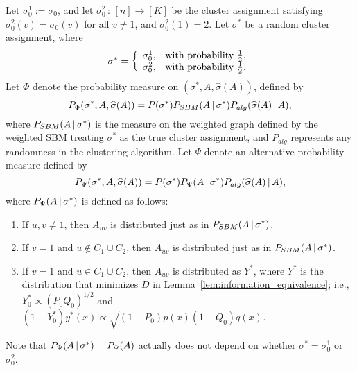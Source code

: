 \documentclass{article}
\begin{document}
Let $\sigma_0^1 := \sigma_0$, and let $\sigma_0^2 \,:\, [n] \rightarrow [K]$ be the cluster assignment satisfying $\sigma_0^2(v) = \sigma_0(v)$ for all $v \neq 1$, and $\sigma_0^2(1) = 2$. Let $\sigma^*$ be a random cluster assignment, where 
\[
\sigma^* = \left \{
     \begin{array}{cc}
     \sigma^1_0,  &  \textrm{with probability } \frac{1}{2}, \\
     \sigma^2_0, & \textrm{with probability } \frac{1}{2}.
    \end{array} \right.
\]
Let $\Phi$ denote the probability measure on $(\sigma^*, A, \hat{\sigma}(A))$, defined by
\[
P_{\Phi}(\sigma^*, A, \widehat{\sigma}(A)) = P(\sigma^*) P_{SBM}(A {\,|\,} \sigma^*) P_{alg}( \widehat{\sigma}(A) {\,|\,} A), 
\]
where $P_{SBM}( A {\,|\,} \sigma^*)$ is the measure on the weighted graph defined by the weighted SBM treating $\sigma^*$ as the true cluster assignment, and $P_{alg}$ represents any randomness in the clustering algorithm. Let $\Psi$ denote an alternative probability measure defined by
\[
P_{\Psi} (\sigma^*, A, \widehat{\sigma}(A)) = P(\sigma^*) P_{\Psi}(A  {\,|\,} \sigma^*) P_{alg}( \widehat{\sigma}(A) {\,|\,} A),
\]
where $P_{\Psi}( A {\,|\,} \sigma^*)$ is defined as follows:
\begin{enumerate}
\item If $u,v \neq 1$, then $A_{uv}$ is distributed just as in $P_{SBM}( A {\,|\,} \sigma^*)$. 
\item If $v = 1$ and $u \notin C_1 \cup C_2$, then $A_{uv}$ is distributed just as in $P_{SBM}( A {\,|\,} \sigma^*)$.
\item If $v = 1$ and $u \in C_1 \cup C_2$, then $A_{uv}$ is distributed as $Y^*$, where $Y^*$ is the distribution that minimizes $D$ in Lemma~\ref{lem:information_equivalence}; i.e., $Y_0^* \propto (P_0 Q_0)^{1/2}$ and $(1-Y_0^*) y^*(x) \propto \sqrt{(1-P_0)p(x)(1-Q_0) q(x)}$.
\end{enumerate}
Note that $P_{\Psi}(A {\,|\,} \sigma^*) = P_{\Psi}(A)$ actually does not depend on whether $\sigma^* = \sigma_0^1$ or $\sigma_0^2$.
\end{document}
